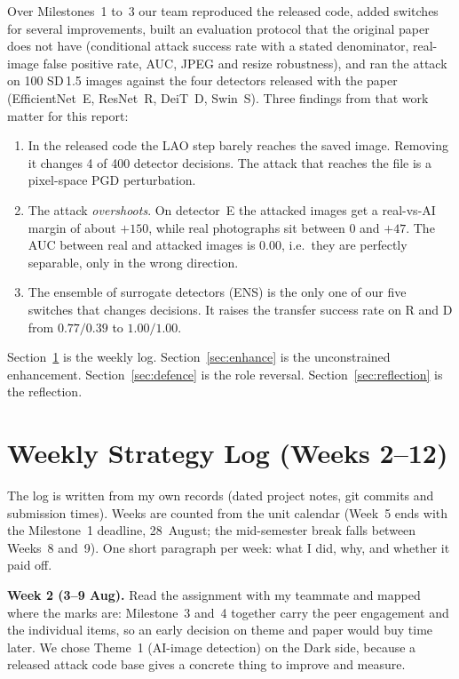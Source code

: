 \documentclass[journal]{IEEEtran}
\begin{document}
Over Milestones~1 to~3 our team reproduced the released code, added switches for several improvements, built an evaluation protocol that the original paper does not have (conditional attack success rate with a stated denominator, real-image false positive rate, AUC, JPEG and resize robustness), and ran the attack on 100 SD\,1.5 images against the four detectors released with the paper (EfficientNet~E, ResNet~R, DeiT~D, Swin~S). Three findings from that work matter for this report:
\begin{enumerate}
  \item In the released code the LAO step barely reaches the saved image. Removing it changes 4 of 400 detector decisions. The attack that reaches the file is a pixel-space PGD perturbation.
  \item The attack \emph{overshoots}. On detector~E the attacked images get a real-vs-AI margin of about $+150$, while real photographs sit between $0$ and $+47$. The AUC between real and attacked images is $0.00$, i.e.\ they are perfectly separable, only in the wrong direction.
  \item The ensemble of surrogate detectors (ENS) is the only one of our five switches that changes decisions. It raises the transfer success rate on R and D from $0.77/0.39$ to $1.00/1.00$.
\end{enumerate}

Section~\ref{sec:log} is the weekly log. Section~\ref{sec:enhance} is the unconstrained enhancement. Section~\ref{sec:defence} is the role reversal. Section~\ref{sec:reflection} is the reflection.

\section{Weekly Strategy Log (Weeks 2--12)}
\label{sec:log}

The log is written from my own records (dated project notes, git commits and submission times). Weeks are counted from the unit calendar (Week~5 ends with the Milestone~1 deadline, 28~August; the mid-semester break falls between Weeks~8 and~9). One short paragraph per week: what I did, why, and whether it paid off.

\textbf{Week 2 (3--9 Aug).} Read the assignment with my teammate and mapped where the marks are: Milestone~3 and~4 together carry the peer engagement and the individual items, so an early decision on theme and paper would buy time later. We chose Theme~1 (AI-image detection) on the Dark side, because a released attack code base gives a concrete thing to improve and measure.
\end{document}
